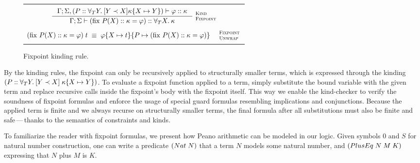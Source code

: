 \documentclass[english, mgr]{iithesis}
\newcommand{\fix}[3]{\ensuremath{\text{fix }#1(#2)\ofkind#3=}}\newcommand{\myatop}[2]{\ensuremath{\genfrac{}{}{0pt}{}{#1\hfill}{#2\hfill}}}
\newcommand{\scbrk}[2]{\myatop{\textsc{#1}}{\textsc{#2}}}
\newcommand{\mdash}{\,---\,}
\def\-{{\mdash}}
\begin{document}
\begin{figure}[htpb]
  \begin{tabularx}{\textwidth}{|C|}
    \hline \\ $
\inference{
  \cEnv;\kEnv, (\propv \ofkind \kForallTerm{Y} \kGuard{Y \cshlt \termv}{\kind\subst{\termv}{Y}})\vdash \formphi \ofkind \kind
}{
  \cEnv;\kEnv\vdash (\fix{\propv}{\termv}{\kind}{\formphi}) \ofkind \kForallTerm{\termv}{\kind}
}\:\scbrk{Kind}{Fixpoint}
  $ \\ \\
  $
(\fix{\propv}{\termv}{\kind}{\formphi})\fApp\term
\;\equiv\;
\formphi\subst{\termv}{\term}\subst{\propv}{(\fix{\propv}{\termv}{\kind}{\formphi})}
\quad\:\scbrk{Fixpoint}{Unwrap}$
  \\ \\ \hline
\end{tabularx}
  \caption{Fixpoint kinding rule.}
  \label{fig:fixpoint-kinding}
\end{figure}
By the kinding rules, the fixpoint can only be recursively applied to structurally smaller terms,
which is expressed through the kinding $(P :: \forall_T Y .\: [Y \prec X]{\;\kappa\{X\mapsto Y\}})$.
To evaluate a fixpoint function applied to a term, simply substitute the bound
variable with the given term and replace recursive calls inside the fixpoint's body with the fixpoint itself.
This way we enable the kind-checker to verify the soundness of fixpoint formulas
and enforce the usage of special guard formulas resembling implications and conjunctions.
Because the applied term is finite
and we always recurse on structurally smaller terms,
the final formula after all substitutions must also be finite and safe\-thanks
to the semantics of constraints and kinds.

To familiarize the reader with fixpoint formulas,
we present how Peano arithmetic can be modeled in our logic.
Given symbols $0$ and $S$ for natural number construction,
one can write a predicate $({Nat}\;N)$
that a term $N$ models some natural number,
and $({PlusEq}\;N\;M\;K)$
expressing that $N$ plus $M$ is $K$.

\pagebreak
\end{document}
